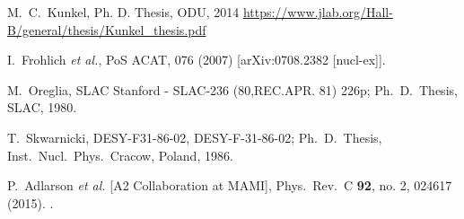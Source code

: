\documentclass[aps,prc,twocolumn,floatfix,showpacs,preprintnumbers,amsmath,amssymb,superscriptaddress,linenumbers]{revtex4-1}
\begin{document}
\begin{thebibliography}{99}
 M.~C.~Kunkel,  Ph. D. Thesis, ODU, 2014 
\url{https://www.jlab.org/Hall-B/general/thesis/Kunkel_thesis.pdf}

 I.~Frohlich {\it et al.}, 
	PoS ACAT{\bf }, 076 (2007) [arXiv:0708.2382 [nucl-ex]].

  M.~Oreglia,
  SLAC Stanford - SLAC-236 (80,REC.APR. 81) 226p; 
  Ph.~D.~Thesis, SLAC, 1980.

  T.~Skwarnicki,
  DESY-F31-86-02, DESY-F-31-86-02;
  Ph.~D.~Thesis, Inst.\ Nucl.\ Phys.\ Cracow, Poland, 1986.

  P.~Adlarson {\it et al.} [A2 Collaboration at MAMI],
  Phys.\ Rev.\ C {\bf 92}, no. 2, 024617 (2015).
.
  
\end{thebibliography}
\end{document}
